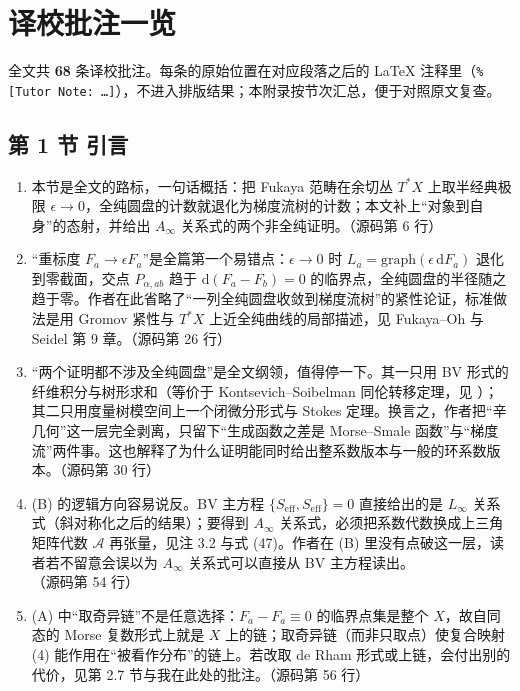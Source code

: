 \section{译校批注一览}\label{app:notes}

\noindent 全文共 \textbf{68} 条译校批注。每条的原始位置在对应段落之后的 LaTeX 注释里（\verb|% [Tutor Note: …]|），不进入排版结果；本附录按节次汇总，便于对照原文复查。

\subsection*{第 1 节 引言}
\begin{enumerate}
  \item 本节是全文的路标，一句话概括：把 Fukaya 范畴在余切丛 $T^*X$ 上取半经典极限 $\epsilon\to0$，全纯圆盘的计数就退化为梯度流树的计数；本文补上“对象到自身”的态射，并给出 $A_\infty$ 关系式的两个非全纯证明。\hfill{\footnotesize （源码第 6 行）}
  \item “重标度 $F_a\to\epsilon F_a$”是全篇第一个易错点：$\epsilon\to0$ 时 $L_a=\mathrm{graph}(\epsilon\,\mathrm{d}F_a)$ 退化到零截面，交点 $P_{\alpha,ab}$ 趋于 $\mathrm{d}(F_a-F_b)=0$ 的临界点，全纯圆盘的半径随之趋于零。作者在此省略了“一列全纯圆盘收敛到梯度流树”的紧性论证，标准做法是用 Gromov 紧性与 $T^*X$ 上近全纯曲线的局部描述，见 Fukaya--Oh \cite{fukayaoh} 与 Seidel \cite{seidel} 第 9 章。\hfill{\footnotesize （源码第 26 行）}
  \item “两个证明都不涉及全纯圆盘”是全文纲领，值得停一下。其一只用 BV 形式的纤维积分与树形求和（等价于 Kontsevich--Soibelman 同伦转移定理，见 \cite{kontsevichsoibelman}）；其二只用度量树模空间上一个闭微分形式与 Stokes 定理。换言之，作者把“辛几何”这一层完全剥离，只留下“生成函数之差是 Morse--Smale 函数”与“梯度流”两件事。这也解释了为什么证明能同时给出整系数版本与一般的环系数版本。\hfill{\footnotesize （源码第 30 行）}
  \item (B) 的逻辑方向容易说反。BV 主方程 $\{S_{\mathrm{eff}},S_{\mathrm{eff}}\}=0$ 直接给出的是 $L_\infty$ 关系式（斜对称化之后的结果）；要得到 $A_\infty$ 关系式，必须把系数代数换成上三角矩阵代数 $\mathcal A$ 再张量，见注 3.2 与式 (47)。作者在 (B) 里没有点破这一层，读者若不留意会误以为 $A_\infty$ 关系式可以直接从 BV 主方程读出。\hfill{\footnotesize （源码第 54 行）}
  \item (A) 中“取奇异链”不是任意选择：$F_a-F_a\equiv0$ 的临界点集是整个 $X$，故自同态的 Morse 复数形式上就是 $X$ 上的链；取奇异链（而非只取点）使复合映射 (4) 能作用在“被看作分布”的链上。若改取 de Rham 形式或上链，会付出别的代价，见第 2.7 节与我在此处的批注。\hfill{\footnotesize （源码第 56 行）}
\end{enumerate}

